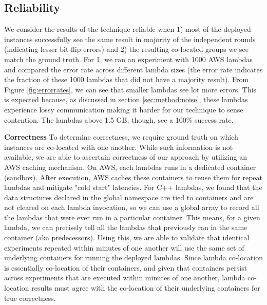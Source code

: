 \subsection{Reliability}
We consider the results of the technique reliable when 1) most of the deployed
instances successfully see the same result in majority of the independent rounds
(indicating lesser bit-flip errors) and 2) the resulting co-located groups we
see match the ground truth.  For 1, we ran an experiment with 1000 AWS lambdas
and compared the error rate across different lambda sizes (the error rate
indicates the fraction of these 1000 lambdas that did not have a majority
result). From Figure \ref{fig:errorrates}, we can see that smaller lambdas see
lot more errors. This is expected because, as discussed in section
\ref{sec:method:noise}, these lambdas experience lossy communication making it
harder for our technique to sense contention. The lambdas above 1.5 GB, though,
see a 100\% success rate.   

\textbf{Correctness} 
To determine correctness, we require ground truth on which instances are
co-located with one another. While such information is not available, we are 
able to ascertain correctness of our approach by utilizing an AWS
caching mechanism. On AWS, each lambdas runs in a dedicated container (sandbox).
After execution, AWS caches these containers to reuse 
them\cite{awscontainerreuse} for repeat lambdas and mitigate
"cold start" latencies. For C++ lambdas, we found that the data structures
declared in the global namespace are tied to containers and are not cleared on
each lambda invocation, so we can use a global array to record all the lambdas
that were ever run in a particular container. This means, for a given lambda, we
can precisely tell all the lambdas that previously ran in the same container
(aka predecessors).  Using this, we are able to validate that identical
experiments repeated within minutes of one another will use the same set of
underlying containers for running the deployed lambdas. Since lambda co-location
is essentially co-location of their containers, and given that containers
persist across experiments that are executed within minutes of one another,
lambda co-location results must agree with the co-location of their underlying
containers for true correctness.


